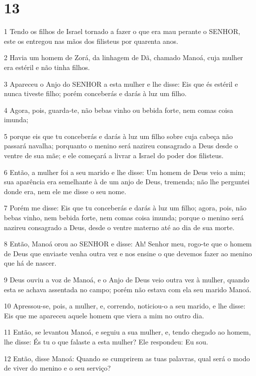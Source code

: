 \chapter{13}

\par 1 Tendo os filhos de Israel tornado a fazer o que era mau perante o SENHOR, este os entregou nas mãos dos filisteus por quarenta anos.
\par 2 Havia um homem de Zorá, da linhagem de Dã, chamado Manoá, cuja mulher era estéril e não tinha filhos.
\par 3 Apareceu o Anjo do SENHOR a esta mulher e lhe disse: Eis que és estéril e nunca tiveste filho; porém conceberás e darás à luz um filho.
\par 4 Agora, pois, guarda-te, não bebas vinho ou bebida forte, nem comas coisa imunda;
\par 5 porque eis que tu conceberás e darás à luz um filho sobre cuja cabeça não passará navalha; porquanto o menino será nazireu consagrado a Deus desde o ventre de sua mãe; e ele começará a livrar a Israel do poder dos filisteus.
\par 6 Então, a mulher foi a seu marido e lhe disse: Um homem de Deus veio a mim; sua aparência era semelhante à de um anjo de Deus, tremenda; não lhe perguntei donde era, nem ele me disse o seu nome.
\par 7 Porém me disse: Eis que tu conceberás e darás à luz um filho; agora, pois, não bebas vinho, nem bebida forte, nem comas coisa imunda; porque o menino será nazireu consagrado a Deus, desde o ventre materno até ao dia de sua morte.
\par 8 Então, Manoá orou ao SENHOR e disse: Ah! Senhor meu, rogo-te que o homem de Deus que enviaste venha outra vez e nos ensine o que devemos fazer ao menino que há de nascer.
\par 9 Deus ouviu a voz de Manoá, e o Anjo de Deus veio outra vez à mulher, quando esta se achava assentada no campo; porém não estava com ela seu marido Manoá.
\par 10 Apressou-se, pois, a mulher, e, correndo, noticiou-o a seu marido, e lhe disse: Eis que me apareceu aquele homem que viera a mim no outro dia.
\par 11 Então, se levantou Manoá, e seguiu a sua mulher, e, tendo chegado ao homem, lhe disse: És tu o que falaste a esta mulher? Ele respondeu: Eu sou.
\par 12 Então, disse Manoá: Quando se cumprirem as tuas palavras, qual será o modo de viver do menino e o seu serviço?
